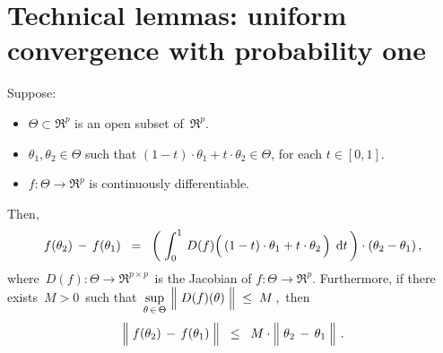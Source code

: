 

\section{Technical lemmas: uniform convergence with probability one}
\setcounter{theorem}{0}
\setcounter{equation}{0}


\renewcommand{\theenumi}{\roman{enumi}}
\renewcommand{\labelenumi}{\textnormal{(\theenumi)}$\;\;$}


\begin{lemma}
\label{FTCRpRp}
\mbox{}\vskip 0.1cm
\noindent
Suppose:
\begin{itemize}
\item
	$\Theta \subset \Re^{p}$ is an open subset of \,$\Re^{p}$.
\item
	$\theta_{1}, \theta_{2} \in \Theta$ such that $(1-t) \cdot \theta_{1} + t \cdot \theta_{2} \in \Theta$, for each $t \in [0,1]$.
\item
	$f : \Theta \longrightarrow \Re^{p}$ is continuously differentiable.
\end{itemize}
Then,
\begin{equation*}
f(\theta_{2}) \, - \, f(\theta_{1})
\;\; = \;\;
	\left(\;\int_{0}^{1}\, D(f)\!\left(\,(1-t)\cdot \theta_{1} \overset{{\color{white}.}}{+} t \cdot \theta_{2} \,\right) \;\d t\,\right)
	\cdot (\theta_{2} - \theta_{1})\,,
\end{equation*}
where \,$D(f) : \Theta \longrightarrow \Re^{p \times p}$\,
is the Jacobian of $f : \Theta \longrightarrow \Re^{p}$.
Furthermore, if there exists \,$M > 0$\, such that
\,$\underset{\theta\,\in\,\Theta}{\sup}\,\left\Vert\;\overset{{\color{white}.}}{D}(f)(\theta)\;\right\Vert \;\leq\; M$\,,\,
then
\begin{equation*}
\left\Vert\; f(\theta_{2}) \, \overset{{\color{white}.}}{-} \, f(\theta_{1}) \;\right\Vert
\;\; \leq \;\;
	M %
	\cdot
	\left\Vert\; \theta_{2} \,\overset{{\color{white}.}}{-}\, \theta_{1} \;\right\Vert\,.
\end{equation*}
\end{lemma}
